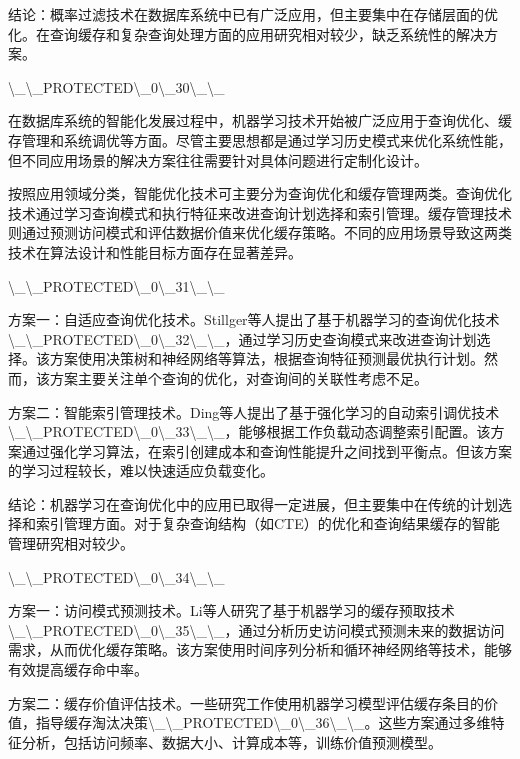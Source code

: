 结论：概率过滤技术在数据库系统中已有广泛应用，但主要集中在存储层面的优化。在查询缓存和复杂查询处理方面的应用研究相对较少，缺乏系统性的解决方案。

\textbackslash{}_\textbackslash{}_PROTECTED\textbackslash{}_0\textbackslash{}_30\textbackslash{}_\textbackslash{}_

在数据库系统的智能化发展过程中，机器学习技术开始被广泛应用于查询优化、缓存管理和系统调优等方面。尽管主要思想都是通过学习历史模式来优化系统性能，但不同应用场景的解决方案往往需要针对具体问题进行定制化设计。

按照应用领域分类，智能优化技术可主要分为查询优化和缓存管理两类。查询优化技术通过学习查询模式和执行特征来改进查询计划选择和索引管理。缓存管理技术则通过预测访问模式和评估数据价值来优化缓存策略。不同的应用场景导致这两类技术在算法设计和性能目标方面存在显著差异。

\textbackslash{}_\textbackslash{}_PROTECTED\textbackslash{}_0\textbackslash{}_31\textbackslash{}_\textbackslash{}_

方案一：自适应查询优化技术。Stillger等人提出了基于机器学习的查询优化技术\textbackslash{}_\textbackslash{}_PROTECTED\textbackslash{}_0\textbackslash{}_32\textbackslash{}_\textbackslash{}_，通过学习历史查询模式来改进查询计划选择。该方案使用决策树和神经网络等算法，根据查询特征预测最优执行计划。然而，该方案主要关注单个查询的优化，对查询间的关联性考虑不足。

方案二：智能索引管理技术。Ding等人提出了基于强化学习的自动索引调优技术\textbackslash{}_\textbackslash{}_PROTECTED\textbackslash{}_0\textbackslash{}_33\textbackslash{}_\textbackslash{}_，能够根据工作负载动态调整索引配置。该方案通过强化学习算法，在索引创建成本和查询性能提升之间找到平衡点。但该方案的学习过程较长，难以快速适应负载变化。

结论：机器学习在查询优化中的应用已取得一定进展，但主要集中在传统的计划选择和索引管理方面。对于复杂查询结构（如CTE）的优化和查询结果缓存的智能管理研究相对较少。

\textbackslash{}_\textbackslash{}_PROTECTED\textbackslash{}_0\textbackslash{}_34\textbackslash{}_\textbackslash{}_

方案一：访问模式预测技术。Li等人研究了基于机器学习的缓存预取技术\textbackslash{}_\textbackslash{}_PROTECTED\textbackslash{}_0\textbackslash{}_35\textbackslash{}_\textbackslash{}_，通过分析历史访问模式预测未来的数据访问需求，从而优化缓存策略。该方案使用时间序列分析和循环神经网络等技术，能够有效提高缓存命中率。

方案二：缓存价值评估技术。一些研究工作使用机器学习模型评估缓存条目的价值，指导缓存淘汰决策\textbackslash{}_\textbackslash{}_PROTECTED\textbackslash{}_0\textbackslash{}_36\textbackslash{}_\textbackslash{}_。这些方案通过多维特征分析，包括访问频率、数据大小、计算成本等，训练价值预测模型。

